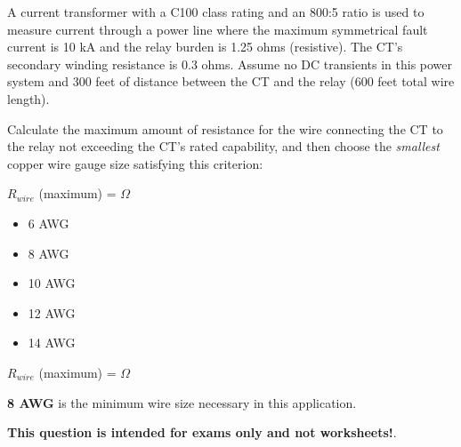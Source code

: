 

A current transformer with a C100 class rating and an 800:5 ratio is used to measure current through a power line where the maximum symmetrical fault current is 10 kA and the relay burden is 1.25 ohms (resistive).  The CT's secondary winding resistance is 0.3 ohms.  Assume no DC transients in this power system and 300 feet of distance between the CT and the relay (600 feet total wire length).

\vskip 10pt

Calculate the maximum amount of resistance for the wire connecting the CT to the relay not exceeding the CT's rated capability, and then choose the {\it smallest} copper wire gauge size satisfying this criterion:

\vskip 10pt

$R_{wire}$ (maximum) = \underbar{\hskip 50pt} $\Omega$

\vskip 10pt

\begin{itemize}
\item{} 6 AWG
\item{} 8 AWG
\item{} 10 AWG
\item{} 12 AWG
\item{} 14 AWG
\end{itemize}







$R_{wire}$ (maximum) =  $\Omega$

\vskip 10pt

{\bf 8 AWG} is the minimum wire size necessary in this application.







{\bf This question is intended for exams only and not worksheets!}.



